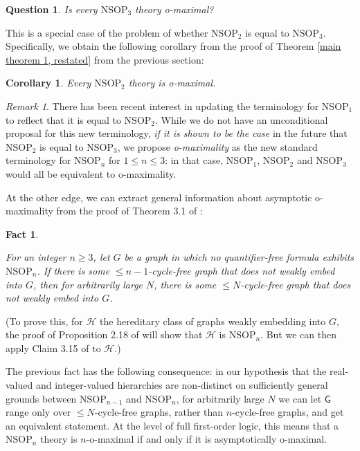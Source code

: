 \documentclass{amsart}
\newtheorem{question}[theorem]{Question}
\newtheorem{cor}[theorem]{Corollary}
\newtheorem{fact}[theorem]{Fact}
\theoremstyle{definition}
\theoremstyle{remark}
\newtheorem{remark}[theorem]{Remark}
\numberwithin{equation}{section}
\begin{document}
\begin{question}
    Is every $\mathrm{NSOP}_{3}$ theory o-maximal?
\end{question}

This is a special case of the problem of whether $\mathrm{NSOP}_{2}$ is equal to $\mathrm{NSOP}_{3}$. Specifically, we obtain the following corollary from the proof of Theorem \ref{main theorem 1, restated} from the previous section:

\begin{cor}\label{nsop2 implies o-maximality}
    Every $\mathrm{NSOP}_{2}$ theory is o-maximal.
\end{cor}

\begin{remark}
    There has been recent interest in updating the terminology for $\mathrm{NSOP}_{1}$ to reflect that it is equal to $\mathrm{NSOP}_{2}$. While we do not have an unconditional proposal for this new terminology, \textit{if it is shown to be the case} in the future that $\mathrm{NSOP}_{2}$ is equal to $\mathrm{NSOP}_{3}$, we propose \textit{o-maximality} as the new standard terminology for $\mathrm{NSOP}_{n}$ for $1 \leq n \leq 3$: in that case, $\mathrm{NSOP}_{1}$, $\mathrm{NSOP}_{2}$ and $\mathrm{NSOP}_{3}$ would all be equivalent to o-maximality.
\end{remark}

At the other edge, we can extract general information about asymptotic o-maximality from the proof of Theorem 3.1 of \cite{ApproxOrder}:

\begin{fact}\label{n-cycle-free to small cycle-free}

For an integer $n \geq 3$, let $G$ be a graph in which no quantifier-free formula exhibits $\mathrm{NSOP}_{n}$. If there is some $\leq n-1$-cycle-free graph that does not weakly embed into $G$, then for arbitrarily large $N$, there is some $\leq N$-cycle-free graph that does not weakly embed into $G$.
    
\end{fact}

(To prove this, for $\mathcal{H}$ the hereditary class of graphs weakly embedding into $G$, the proof of Proposition 2.18 of \cite{ApproxOrder} will show that $\mathcal{H}$ is $\mathrm{NSOP}_{n}$. But we can then apply Claim 3.15 of \cite{ApproxOrder} to $\mathcal{H}$.)

The previous fact has the following consequence: in our hypothesis that the real-valued and integer-valued hierarchies are non-distinct on sufficiently general grounds between $\mathrm{NSOP}_{n-1}$ and $\mathrm{NSOP}_{n}$, for arbitrarily large $N$ we can let $\mathsf{G}$ range only over $\leq N$-cycle-free graphs, rather than $n$-cycle-free graphs, and get an equivalent statement. At the level of full first-order logic, this means that a $\mathrm{NSOP}_{n}$ theory is $n$-o-maximal if and only if it is asymptotically o-maximal.
\end{document}

